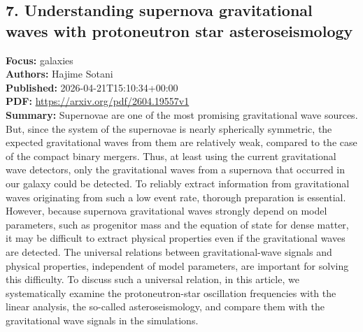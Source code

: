 \documentclass[11pt]{article}
\begin{document}
\subsection*{7. Understanding supernova gravitational waves with protoneutron star asteroseismology}
\textbf{Focus:} galaxies\\
\textbf{Authors:} Hajime Sotani\\
\textbf{Published:} 2026-04-21T15:10:34+00:00\\
\textbf{PDF:} \href{https://arxiv.org/pdf/2604.19557v1}{https://arxiv.org/pdf/2604.19557v1}\\
\textbf{Summary:}
Supernovae are one of the most promising gravitational wave sources. But, since the system of the supernovae is nearly spherically symmetric, the expected gravitational waves from them are relatively weak, compared to the case of the compact binary mergers. Thus, at least using the current gravitational wave detectors, only the gravitational waves from a supernova that occurred in our galaxy could be detected. To reliably extract information from gravitational waves originating from such a low event rate, thorough preparation is essential. However, because supernova gravitational waves strongly depend on model parameters, such as progenitor mass and the equation of state for dense matter, it may be difficult to extract physical properties even if the gravitational waves are detected. The universal relations between gravitational-wave signals and physical properties, independent of model parameters, are important for solving this difficulty. To discuss such a universal relation, in this article, we systematically examine the protoneutron-star oscillation frequencies with the linear analysis, the so-called asteroseismology, and compare them with the gravitational wave signals in the simulations.
\newpage
\end{document}
